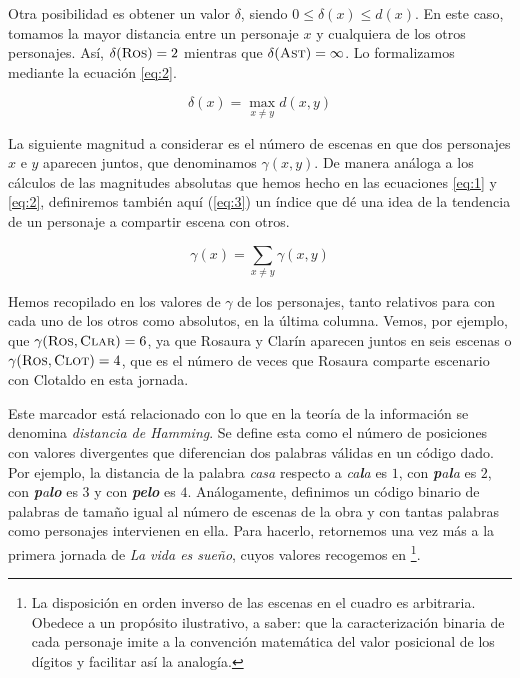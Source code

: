 

Otra posibilidad es obtener un valor $\delta$, siendo $0 \leq \delta(x) \leq d(x)$. En este caso, tomamos la mayor distancia entre un personaje $x$ y cualquiera de los otros personajes. Así, $\delta(\textsc{Ros}) = 2$ mientras que $\delta(\textsc{Ast}) = \infty$. Lo formalizamos mediante la ecuación \ref{eq:2}.

\begin{equation}\label{eq:2}
	\delta(x) = \max_{x \neq y} d(x,y)
\end{equation}

La siguiente magnitud a considerar es el número de escenas en que dos personajes $x$ e $y$ aparecen juntos, que denominamos $\gamma(x,y)$. De manera análoga a los cálculos de las magnitudes absolutas que hemos hecho en las ecuaciones \ref{eq:1} y \ref{eq:2}, definiremos también aquí (\ref{eq:3}) un índice que dé una idea de la tendencia de un personaje a compartir escena con otros. 

\begin{equation}\label{eq:3}
	\gamma(x) = \sum_{x \neq y}{\gamma(x,y)}
\end{equation}

Hemos recopilado en  los valores de $\gamma$ de los personajes, tanto relativos para con cada uno de los otros como absolutos, en la última columna. Vemos, por ejemplo, que  $\gamma(\textsc{Ros},\textsc{Clar}) = 6$, ya que Rosaura y Clarín aparecen juntos en seis escenas o $\gamma(\textsc{Ros},\textsc{Clot}) = 4$, que es el número de veces que Rosaura comparte escenario con Clotaldo en esta jornada.




Este marcador está relacionado con lo que en la teoría de la información se denomina \textit{distancia de Hamming}. Se define esta como el número de posiciones con valores divergentes que diferencian dos palabras válidas en un código dado. Por ejemplo, la distancia de la palabra \textit{casa} respecto a  \textit{ca\textbf{l}a} es $1$, con \textit{\textbf{p}a\textbf{l}a} es $2$, con \textit{\textbf{p}a\textbf{lo}} es $3$ y con \textit{\textbf{pelo}} es $4$. Análogamente, definimos un código binario de palabras de tamaño igual al número de escenas de la obra y con tantas palabras como personajes intervienen en ella. Para hacerlo, retornemos una vez más a la primera jornada de \textit{La vida es sueño}, cuyos valores recogemos en \footnote{La disposición en orden inverso de las escenas en el cuadro es arbitraria. Obedece a un propósito ilustrativo, a saber: que la caracterización binaria de cada personaje imite a la convención matemática del valor posicional de los dígitos y facilitar así la analogía.}.

